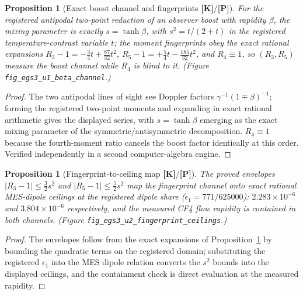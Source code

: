 \documentclass[10pt]{article}
\newtheorem{proposition}[theorem]{Proposition}
\theoremstyle{definition}
\newcommand{\code}[1]{\texttt{\small #1}}
\newcommand{\tier}[1]{\textbf{[#1]}}
\begin{document}
\begin{proposition}[Exact boost channel and fingerprints
\tier{K}/\tier{P}]
\label{prop:u1}
For the registered antipodal two-point reduction of an observer boost
with rapidity $\beta$, the mixing parameter is exactly
$s = \tanh\beta$, with $s^2 = t/(2+t)$ in the registered
temperature-contrast variable $t$; the moment fingerprints obey the
exact rational expansions
$R_3 - 1 = -\tfrac{3}{4}t + \tfrac{87}{32}t^2$,
$R_5 - 1 = +\tfrac{5}{4}t - \tfrac{185}{32}t^2$, and $R_4 \equiv 1$,
so $(R_3, R_5)$ measure the boost channel while $R_4$ is blind to it.
(Figure \code{fig\_egs3\_u1\_beta\_channel}.)
\end{proposition}
\begin{proof}
The two antipodal lines of sight see Doppler factors
$\gamma^{-1}(1 \mp \beta)^{-1}$; forming the registered two-point
moments and expanding in exact rational arithmetic gives the displayed
series, with $s = \tanh\beta$ emerging as the exact mixing parameter
of the symmetric/antisymmetric decomposition. $R_4 \equiv 1$ because
the fourth-moment ratio cancels the boost factor identically at this
order. Verified independently in a second computer-algebra engine.
\end{proof}

\begin{proposition}[Fingerprint-to-ceiling map \tier{K}/\tier{P}]
\label{prop:u2}
The proved envelopes $|R_3 - 1| \le \tfrac{3}{2}s^2$ and
$|R_5 - 1| \le \tfrac{5}{2}s^2$ map the fingerprint channel onto exact
rational MES-dipole ceilings at the registered dipole share
($\epsilon_1 = 771/625000$): $2.283\times10^{-6}$ and
$3.804\times10^{-6}$ respectively, and the measured CF4 flow rapidity
is contained in both channels. (Figure
\code{fig\_egs3\_u2\_fingerprint\_ceilings}.)
\end{proposition}
\begin{proof}
The envelopes follow from the exact expansions of
Proposition~\ref{prop:u1} by bounding the quadratic terms on the
registered domain; substituting the registered $\epsilon_1$ into the
MES dipole relation converts the $s^2$ bounds into the displayed
ceilings, and the containment check is direct evaluation at the
measured rapidity.
\end{proof}
\end{document}
